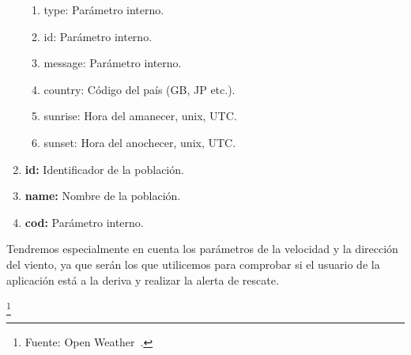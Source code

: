 \begin{enumerate}
\begin{enumerate}
\item type: Parámetro interno.
\item id: Parámetro interno.
\item message: Parámetro interno.
\item country: Código del país (GB, JP etc.).
\item sunrise: Hora del amanecer, unix, UTC.
\item sunset: Hora del anochecer, unix, UTC.
\end{enumerate}
\item  \textbf{id:} Identificador de la población.
\item  \textbf{name:} Nombre de la población.
\item  \textbf{cod:} Parámetro interno.
\end{enumerate}

Tendremos especialmente en cuenta los parámetros de la
 velocidad y la dirección del viento, ya que serán los que utilicemos
 para comprobar si el usuario de la aplicación está a la deriva y
 realizar la alerta de rescate.

\footnote{Fuente: Open Weather~\cite{OPENWEATHER}.}
